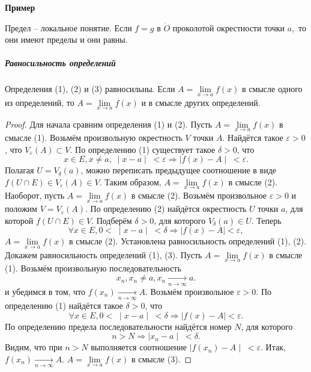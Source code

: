 \par\medskip \textbf{Пример}\par


Предел -- локальное понятие. Если $f=g$ в $\dot{O}$ проколотой окрестности точки $a,$ то они имеют пределы и они равны.

\subparagraph{Равносильность определений}
\begin{Theorem}
Определения (1), (2) и (3) равносильны. Если $A=\lim\limits_{x \to a} f(x)$ в смысле одного из определений, то $A=\lim\limits_{x \to a} f(x)$ и в смысле других определений.
\end{Theorem}
\begin{proof}
Для начала сравним определения (1) и (2).
Пусть $A=\lim\limits_{x \to a} f(x)$ в смысле (1). Возьмём произвольную окрестность $V$ точки $A$. Найдётся такое $\varepsilon>0$, что $V_\varepsilon(A) \subset V$. По определению (1) существует такое $\delta > 0$, что
$$x \in E, x \neq a, \; \mid x - a \mid \; < \varepsilon \Rightarrow \mid f(x) - A \mid \; < \varepsilon.$$
Полагая $U = V_\delta (a)$, можно переписать предыдущее соотношение в виде $f(U \cap E) \in V_\varepsilon(A) \in V$. Таким образом, $A=\lim\limits_{x \to a} f(x)$ в смысле (2).
Наоборот, пусть $A=\lim\limits_{x \to a} f(x)$ в смысле (2). Возьмём произвольное $\varepsilon > 0$ и положим $V = V_\varepsilon(A)$. По определению (2) найдётся окрестность $U$ точки $a$, для которой $f(U \cap E) \in V$. Подберём $\delta > 0$, для которого $V_\delta(a) \in U$. Теперь
$$\forall x \in E, 0 < \; \mid x - a \mid \; < \delta \Rightarrow \mid f(x) - A \mid<\varepsilon,$$
$A=\lim\limits_{x \to a} f(x)$ в смысле (2). Установлена равносильность определений (1), (2).
Докажем равносильность определений (1), (3).
Пусть $A=\lim\limits_{x \to a} f(x)$ в смысле (1). Возьмём произвольную последовательность
$${x_n}, x_n \neq a, x_n \xrightarrow[n\rightarrow\infty]{} a.$$
и убедимся в том, что $f(x_n) \xrightarrow[n\rightarrow\infty]{} A.$
Возьмём произвольное $\varepsilon > 0$. По определению (1) найдётся такое $\delta > 0$, что
$$\forall x \in E, 0 < \; \mid x - a \mid \; < \delta \Rightarrow \mid f(x) - A \mid < \varepsilon.$$
По определению предела последовательности найдётся номер $N$, для которого
$$ n > N \Rightarrow \mid x_n - a \mid \; < \delta.$$
Видим, что при $n > N$ выполняется соотношение $\mid f(x_n) - A \mid \;  < \varepsilon.$ Итак, $f(x_n) \xrightarrow[n\rightarrow\infty]{} A.$ $A=\lim\limits_{x \to a} f(x)$ в смысле (3).

\end{proof}
